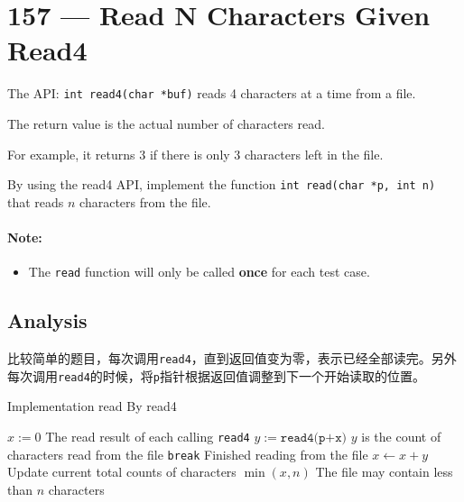 \section{157 --- Read N Characters Given Read4}
The API: \texttt{int read4(char *buf)} reads 4 characters at a time from a file.
\par
The return value is the actual number of characters read.
\par
For example, it returns 3 if there is only 3 characters left in the file.
\par
By using the read4 API, implement the function \texttt{int read(char *p, int n)} that reads $n$ characters from the file.
\paragraph{Note:}
\begin{itemize}
\item The \texttt{read} function will only be called \textbf{once} for each test case.
\end{itemize}
\subsection{Analysis}
\begin{CJK*}{UTF8}{gbsn} 
比较简单的题目，每次调用\texttt{read4}，直到返回值变为零，表示已经全部读完。另外每次调用\texttt{read4}的时候，将\texttt{p}指针根据返回值调整到下一个开始读取的位置。
\end{CJK*}
\setcounter{algorithm}{0}
\begin{algorithm}[H]
\caption{Implementation read By read4}
\begin{algorithmic}[1]
\State $x:=0$ \Comment The read result of each calling \texttt{read4}
\State $y:= \texttt{read4(p+x)}$ \Comment $y$ is the count of characters read from the file
\State \texttt{break} \Comment Finished reading from the file
\EndIf
\State $x\gets x+y$ \Comment Update current total counts of characters 
\EndWhile
\State \Return $\min(x, n)$ \Comment The file may contain less than $n$ characters
\EndProcedure
\end{algorithmic}
\end{algorithm}